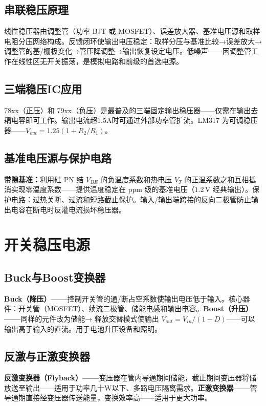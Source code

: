 \documentclass[12pt,UTF8]{ctexbook}
\begin{document}
\subsection{串联稳压原理}

线性稳压器由调整管（功率 BJT 或 MOSFET）、误差放大器、基准电压源和取样电阻分压网络构成。反馈闭环使输出电压稳定：取样分压与基准比较→误差放大→调整管的基/栅极变化→管压降调整→输出恢复设定电压。低噪声——因调整管工作在线性区无开关振荡，是模拟电路和前级的首选电源。

\subsection{三端稳压IC应用}

78xx（正压）和 79xx（负压）是最普及的三端固定输出稳压器——仅需在输出去耦电容即可工作。输出电流超1.5A时可通过外部功率管扩流。LM317 为可调稳压器——$V_{out}=1.25(1+R_2/R_1)$。

\subsection{基准电压源与保护电路}

\textbf{带隙基准：}利用硅 PN 结 $V_{BE}$ 的负温度系数和热电压 $V_T$ 的正温系数之和互相抵消实现零温度系数——提供温度稳定在 ppm 级的基准电压（$1.2\,\mathrm{V}$ 经典输出）。保护电路：过热关断、过流和短路截止保护。输入/输出端跨接的反向二极管防止输出电容在断电时反灌电流损坏稳压器。

\section{开关稳压电源}
\label{sec:switching_regulator}

\subsection{Buck与Boost变换器}

\textbf{Buck（降压）——}控制开关管的通/断占空系数使输出电压低于输入。核心器件：开关管（MOSFET）、续流二极管、储能电感和输出电容。\textbf{Boost（升压）——}同样的元件改为储能→ 释放交替模式使输出 $V_{out}=V_{in}/(1-D)$——可以输出高于输入的直流。用于电池升压设备和照明。

\subsection{反激与正激变换器}

\textbf{反激变换器（Flyback）——}变压器在管内导通期间储能，截止期间变压器将储放送至输出——适用于功率几十W以下、多路电压隔离需求。\textbf{正激变换器——}管导通期直接经变压器传送能量，变换效率高——适用于更大功率。
\end{document}
